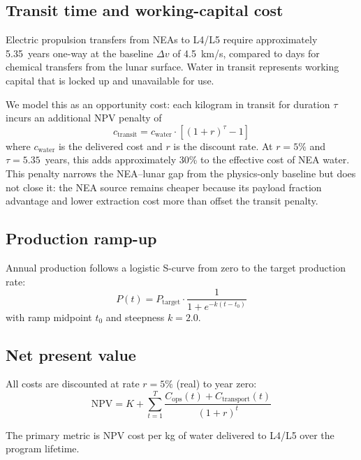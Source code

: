 \documentclass[preprint,12pt]{elsarticle}
\begin{document}
\subsection{Transit time and working-capital cost}
\label{sec:transit}

Electric propulsion transfers from NEAs to L4/L5 require approximately 5.35~years one-way at the baseline $\Delta v$ of 4.5~km/s, compared to days for chemical transfers from the lunar surface. Water in transit represents working capital that is locked up and unavailable for use.

We model this as an opportunity cost: each kilogram in transit for duration $\tau$ incurs an additional NPV penalty of
\begin{equation}
    c_\text{transit} = c_\text{water} \cdot \left[(1+r)^\tau - 1\right]
    \label{eq:transit-cost}
\end{equation}
where $c_\text{water}$ is the delivered cost and $r$ is the discount rate. At $r = 5\%$ and $\tau = 5.35$~years, this adds approximately 30\% to the effective cost of NEA water. This penalty narrows the NEA--lunar gap from the physics-only baseline but does not close it: the NEA source remains cheaper because its payload fraction advantage and lower extraction cost more than offset the transit penalty.

\subsection{Production ramp-up}

Annual production follows a logistic S-curve from zero to the target production rate:
\begin{equation}
    P(t) = P_\text{target} \cdot \frac{1}{1 + e^{-k(t - t_0)}}
    \label{eq:ramp}
\end{equation}
with ramp midpoint $t_0$ and steepness $k = 2.0$.

\subsection{Net present value}

All costs are discounted at rate $r = 5\%$ (real) to year zero:
\begin{equation}
    \text{NPV} = K + \sum_{t=1}^{T} \frac{C_\text{ops}(t) + C_\text{transport}(t)}{(1+r)^t}
    \label{eq:npv}
\end{equation}

The primary metric is NPV cost per kg of water delivered to L4/L5 over the program lifetime.
\end{document}
